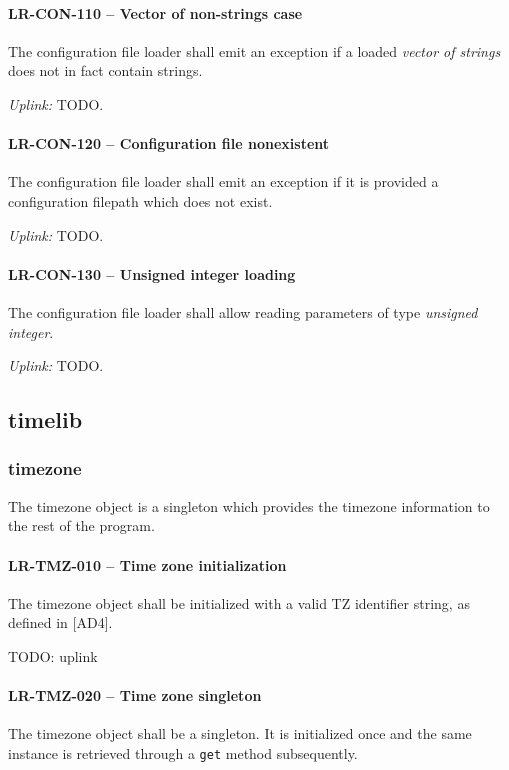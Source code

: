 \paragraph{LR-CON-110 -- Vector of non-strings case}
The configuration file loader shall emit an exception if a loaded
\emph{vector of strings} does not in fact contain strings.

\textit{Uplink: } TODO.

\paragraph{LR-CON-120 -- Configuration file nonexistent}
The configuration file loader shall emit an exception if it is provided
a configuration filepath which does not exist.

\textit{Uplink: } TODO.

\paragraph{LR-CON-130 -- Unsigned integer loading}
The configuration file loader shall allow reading parameters of type
\emph{unsigned integer}.

\textit{Uplink: } TODO.

\subsection{time\textunderscore lib}
\subsubsection{time\textunderscore zone}
The time\textunderscore zone object is a singleton which provides the
timezone information to the rest of the program.

\paragraph{LR-TMZ-010 -- Time zone initialization}
The timezone object shall be initialized with a valid TZ identifier string,
as defined in [AD4].

TODO: uplink
\paragraph{LR-TMZ-020 -- Time zone singleton}
The timezone object shall be a singleton. It is initialized once and the same
instance is retrieved through a \lstinline{get} method subsequently.

